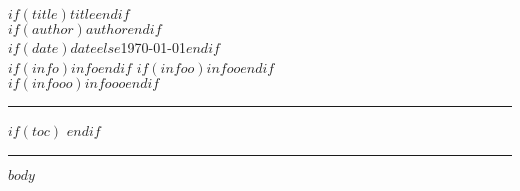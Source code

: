 \documentclass[$if(fontsize)$$fontsize$$endif$, a4paper]{article}
\begin{document}
\begin{center}
    $if(title)$\Large{\textbf{$title$}}$endif$\\
\vspace{0.4cm}
\normalsize
    $if(author)$\underline{\textbf{$author$}}$endif$ \\
\vspace{0.1cm}
$if(date)$$date$$else$\today$endif$\\
\medskip
$if(info)$\small{$info$}$endif$ \hspace*{3cm} $if(infoo)$\small{$infoo$}$endif$\\
\medskip\vspace{0,5cm}
$if(infooo)$\small{$infooo$}$endif$\\



    \medskip
    \normalsize
\end{center}
\medskip

{\color{gray}\hrule}
$if(toc)$ \tableofcontents $endif$
\medskip

{\color{gray}\hrule}
\bigskip

$body$



\end{document}
